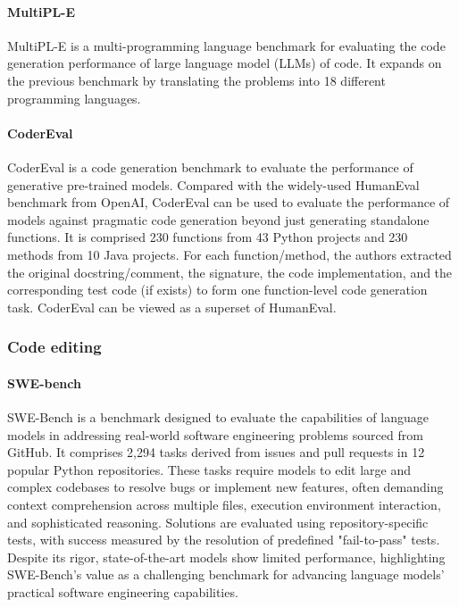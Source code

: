\paragraph{MultiPL-E \cite{cassano2022}}
MultiPL-E is a multi-programming language benchmark for evaluating the code
generation performance of large language model (LLMs) of code. It expands on
the previous benchmark by translating the problems into 18 different
programming languages.

\paragraph{CoderEval \cite{Zhang_2024}}
CoderEval is a code generation benchmark to evaluate the performance
of generative pre-trained models. Compared with the widely-used HumanEval
benchmark from OpenAI, CoderEval can be used to evaluate the performance of
models against pragmatic code generation beyond just generating standalone
functions. It is comprised 230 functions from 43 Python projects and 230 methods
from 10 Java projects. For each function/method, the authors extracted the original
docstring/comment, the signature, the code implementation, and the corresponding
test code (if exists) to form one function-level code generation task. CoderEval
can be viewed as a superset of HumanEval.

\subsubsection{Code editing}

\paragraph{SWE-bench \cite{jimenez2024swebench}}
SWE-Bench is a benchmark designed to evaluate the capabilities of language
models in addressing real-world software engineering problems sourced from
GitHub. It comprises 2,294 tasks derived from issues and pull requests in 12
popular Python repositories. These tasks require models to edit large and
complex codebases to resolve bugs or implement new features, often demanding
context comprehension across multiple files, execution environment interaction,
and sophisticated reasoning. Solutions are evaluated using repository-specific
tests, with success measured by the resolution of predefined "fail-to-pass"
tests. Despite its rigor, state-of-the-art models show limited performance,
highlighting SWE-Bench's value as a challenging benchmark for advancing language
models' practical software engineering capabilities.

